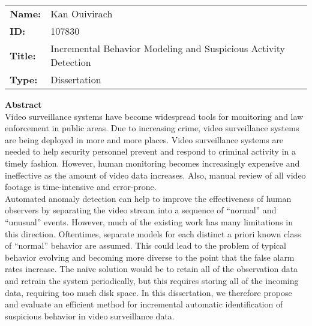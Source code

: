 \documentclass{article}
\date{}
\begin{document}
\pagestyle{empty}
\thispagestyle{empty}


\begin{table}
    \begin{tabular}{ll}
        {\large \bf Name:}  & {\large Kan Ouivirach} \\
        {\large \bf ID:}    & {\large 107830} \\
        {\large \bf Title:} & {\large Incremental Behavior Modeling 
                              and Suspicious Activity Detection} \\
        {\large \bf Type:}  & {\large Dissertation}
    \end{tabular}
\end{table}

\vspace{0.3in}
{\bf \noindent Abstract}\\

\noindent Video surveillance systems have become widespread tools for monitoring
and law enforcement in public areas.  Due to increasing crime, video
surveillance systems are being deployed in more and more places.
Video surveillance systems are needed to help security personnel
prevent and respond to criminal activity in a timely fashion.
However, human monitoring becomes increasingly expensive and
ineffective as the amount of video data increases. Also, manual review of
all video footage is time-intensive and error-prone.\\

\noindent Automated anomaly detection can help to improve the effectiveness of
human observers by separating the video stream into a sequence of
``normal'' and ``unusual'' events. However, much of the existing work
has many limitations in this direction. Oftentimes, separate models
for each distinct a priori known class of ``normal'' behavior are
assumed.  This could lead to the problem of typical behavior evolving
and becoming more diverse to the point that the false alarm rates
increase.  The naive solution would be to retain all of the
observation data and retrain the system periodically, but this
requires storing all of the incoming data, requiring too much disk
space. In this dissertation, we therefore propose and evaluate an
efficient method for incremental automatic identification of
suspicious behavior in video surveillance data.\\
\end{document}
